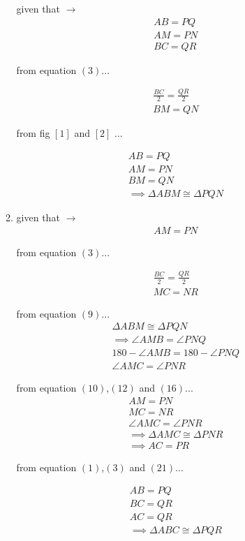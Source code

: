 \begin{enumerate}
\begin{enumerate}
		given that $\to$\\
		\begin{align}
			AB = PQ\\
			AM = PN\\
			BC = QR	
		\end{align}
	
		from equation $\left(3\right)$...
	
		\begin{align}
			\frac{BC}{2} = \frac{QR}{2} \\
			BM = QN
		\end{align}

		from fig $\left[1\right]$ and $\left[2\right]$ ...

		\begin{align}
	 		AB = PQ\\
	 		AM = PN\\
	 		BM = QN\\
			\implies  \Delta ABM \cong \Delta PQN
		\end{align}
	
		\item
		given that $\to$\\
		\begin{align}
			AM = PN
		\end{align}
	
		from equation $\left(3\right)$...
	
		\begin{align}
			\frac{BC}{2} = \frac{QR}{2} \\
			MC = NR
		\end{align}
	
	
		from equation $\left(9\right)$...
		\begin{align}
			\Delta ABM \cong \Delta PQN 
			\\
			\implies \angle AMB = \angle PNQ
			\\
			180 - \angle AMB = 180 -  \angle PNQ
			\\
			\angle AMC = \angle PNR
		\end{align}
	
		from equation $\left(10\right)$,$\left(12\right)$ and $\left(16\right)$...
		\begin{align}
			AM = PN
			\\
			MC = NR
			\\
			\angle AMC = \angle PNR
			\\
			\implies  \Delta AMC \cong \Delta PNR
			\\
			\implies AC = PR
		\end{align}
	
		from equation $\left(1\right)$,$\left(3\right)$ and $\left(21\right)$...
		
		\begin{align}
			AB = PQ\\
			BC = QR\\
			AC = QR\\
			\implies  \Delta ABC \cong \Delta PQR
		\end{align}
	
	\end{enumerate}
	
\end{enumerate}
